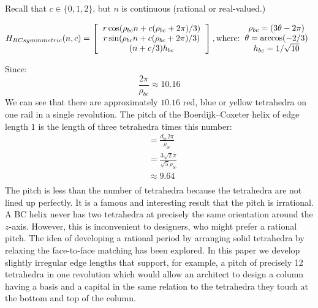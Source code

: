 \documentclass[11pt]{article}
\begin{document}
Recall that $c \in \{0,1,2\}$, but $n$ is continuous (rational or real-valued.)

\begin{equation}
H_{BCsymmmetric}(n,c) =
\left [
  \begin{tabular}{c}
    $ r  \cos(\rho_{bc} n + c (\rho_{bc} +  2 \pi) /3) $\\
   $ r  \sin(\rho_{bc} n + c (\rho_{bc} +  2 \pi) /3) $\\
   $ (n+c/3)  h_{bc} $
  \end{tabular}
  \right ],
\text{where:}
  \begin{tabular}{c}
    $\rho_{bc} = (3 \theta - 2 \pi)$ \\
    $ \theta = \arccos(-2/3) $ \\
    $ h_{bc} = 1/\sqrt{10} $ \\    
  \end{tabular}      
\end{equation}



Since:
\[ \frac{2 \pi}{\rho_{bc}} \approx 10.16
\]
We can see that there are approximately $10.16$ red, blue or yellow tetrahedra on one rail in a single revolution.
The pitch of the Boerdijk--Coxeter helix of edge length $1$ is the length of three tetrahedra times this number:
\begin{align*}
  &= \frac{d_{bc} 2 \pi }{\rho_{bc}} \\  
  &= \frac{3  \sqrt{2}  \pi}{\sqrt{5}\rho_{bc}} \\
  &\approx 9.64 \\
\end{align*}
The pitch is less than the number of tetrahedra because the tetrahedra
are not lined up perfectly.  It is a famous and interesting result
that the pitch is irrational. A BC helix never has two tetrahedra at
precisely the same orientation around the $z$-axis. However, this is
inconvenient to designers, who might prefer a rational pitch.
The idea of developing a rational period by arranging solid tetrahedra by relaxing the face-to-face matching
has been explored\cite{sadler2013periodic}. In this paper
we develop slightly irregular edge lengths that support, for example, a pitch of precisely 12
tetrahedra in one revolution which would allow an architect to design a
column having a basis and a capital in the same relation to the
tetrahedra they touch at the bottom and top of the column.
\end{document}
